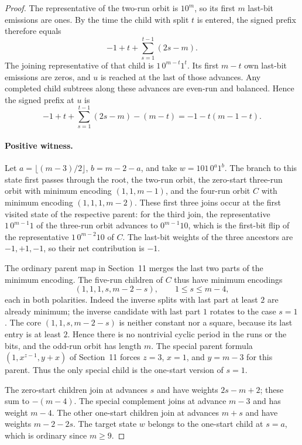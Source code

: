 \documentclass[11pt]{article}
\begin{document}
\begin{proof}
The representative of the two-run orbit is \(10^m\), so its first \(m\) last-bit emissions are ones. By the time the child with split \(t\) is entered, the signed prefix therefore equals
\[
   -1+t+\sum_{s=1}^{t-1}(2s-m).
\]
The joining representative of that child is \(1\,0^{m-t}1^t\). Its first \(m-t\) own last-bit emissions are zeros, and \(u\) is reached at the last of those advances. Any completed child subtrees along these advances are even-run and balanced. Hence the signed prefix at \(u\) is
\[
   -1+t+\sum_{s=1}^{t-1}(2s-m)-(m-t)
   =-1-t(m-1-t).
\]

\paragraph{Positive witness.}
Let \(a=\lfloor(m-3)/2\rfloor\), \(b=m-2-a\), and take
\(w=101\,0^a1^b\).
The branch to this state first passes through the root, the two-run orbit, the zero-start three-run orbit with minimum encoding \((1,1,m-1)\), and the four-run orbit \(C\) with minimum encoding \((1,1,1,m-2)\). These first three joins occur at the first visited state of the respective parent: for the third join, the representative \(1\,0^{m-1}1\) of the three-run orbit advances to \(0^{m-1}10\), which is the first-bit flip of the representative \(1\,0^{m-2}10\) of \(C\). The last-bit weights of the three ancestors are \(-1,+1,-1\), so their net contribution is \(-1\).

The ordinary parent map in Section~11 merges the last two parts of the minimum encoding. The five-run children of \(C\) thus have minimum encodings
\[
  (1,1,1,s,m-2-s),\qquad 1\le s\le m-4,
\]
each in both polarities. Indeed the inverse splits with last part at least \(2\) are already minimum; the inverse candidate with last part \(1\) rotates to the case \(s=1\). The core \((1,1,s,m-2-s)\) is neither constant nor a square, because its last entry is at least \(2\). Hence there is no nontrivial cyclic period in the runs or the bits, and the odd-run orbit has length \(m\). The special parent formula \((1,x^{z-1},y+x)\) of Section~11 forces \(z=3\), \(x=1\), and \(y=m-3\) for this parent. Thus the only special child is the one-start version of \(s=1\).

The zero-start children join at advances \(s\) and have weights \(2s-m+2\); these sum to \(-(m-4)\). The special complement joins at advance \(m-3\) and has weight \(m-4\). The other one-start children join at advances \(m+s\) and have weights \(m-2-2s\). The target state \(w\) belongs to the one-start child at \(s=a\), which is ordinary since \(m\ge9\).


\end{proof}
\end{document}
